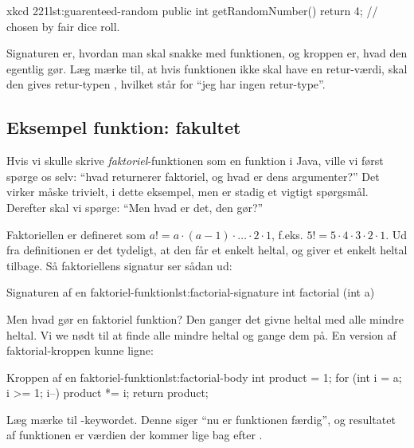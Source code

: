 		\begin{JavaCode}{xkcd 221}{lst:guarenteed-random}
			public int getRandomNumber() {
				return 4;  // chosen by fair dice roll.
			}
		\end{JavaCode}

        Signaturen er, hvordan man skal snakke med funktionen, og
        kroppen er, hvad den egentlig gør. Læg mærke til, at hvis
        funktionen ikke skal have en retur-værdi, skal den gives
        retur-typen , hvilket står for ``jeg har ingen retur-type''.

	\subsection{Eksempel funktion: fakultet}

        Hvis vi skulle skrive \emph{faktoriel}-funktionen som en
        funktion i Java, ville vi først spørge os selv: ``hvad
        returnerer faktoriel, og hvad er dens argumenter?'' Det virker
        måske trivielt, i dette eksempel, men er stadig et vigtigt
        spørgsmål. Derefter skal vi spørge: ``Men hvad er det, den
        gør?''

        Faktoriellen er defineret som \(a! = a \cdot (a-1) \cdot \dots
        \cdot 2 \cdot 1\), f.eks. \(5! = 5 \cdot 4 \cdot 3 \cdot 2
        \cdot 1\). Ud fra definitionen er det tydeligt, at den får et
        enkelt heltal, og giver et enkelt heltal tilbage. Så
        faktoriellens signatur ser sådan ud:

		\begin{JavaCode}{Signaturen af en faktoriel-funktion}{lst:factorial-signature}
			int factorial (int a)
		\end{JavaCode}

		Men hvad gør en faktoriel funktion? Den ganger det givne heltal med alle mindre
		heltal. Vi we nødt til at finde alle mindre heltal og gange dem på. En version
		af faktorial-kroppen kunne ligne:

		\begin{JavaCode}{Kroppen af en faktoriel-funktion}{lst:factorial-body}
			int product = 1;
			for (int i = a; i >= 1; i--)
				product *= i;
			return product;
		\end{JavaCode}

        Læg mærke til -keywordet. Denne siger ``nu
        er funktionen færdig'', og resultatet af funktionen er værdien
        der kommer lige bag efter .

